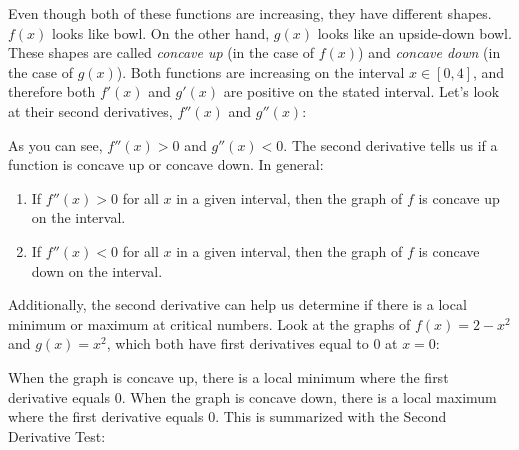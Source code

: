 Even though both of these functions are increasing, they have different shapes. $f(x)$ looks like bowl. On the other hand, $g(x)$ looks like an upside-down bowl. These shapes are called \textit{concave up} (in the case of $f(x)$) and \textit{concave down} (in the case of $g(x)$). Both functions are increasing on the interval $x \in [0, 4]$, and therefore both $f'(x)$ and $g'(x)$ are positive on the stated interval. Let's look at their second derivatives, $f''(x)$ and $g''(x)$:

\begin{figure}
\centering
{}
\end{figure}

As you can see, $f''(x) >0$ and $g''(x)<0$. The second derivative tells us if a function is concave up or concave down. In general:
\begin{enumerate}
\item If $f''(x)>0$ for all $x$ in a given interval, then the graph of $f$ is concave up on the interval.
\item If $f''(x)<0$ for all $x$ in a given interval, then the graph of $f$ is concave down on the interval.
\end{enumerate}

Additionally, the second derivative can help us determine if there is a local minimum or maximum at critical numbers. Look at the graphs of $f(x) = 2-x^2$ and $g(x) = x^2$, which both have first derivatives equal to $0$ at $x=0$:
\begin{figure}
\centering
{}
\end{figure}

When the graph is concave up, there is a local minimum where the first derivative equals $0$. When the graph is concave down, there is a local maximum where the first derivative equals $0$. This is summarized with the Second Derivative Test:

